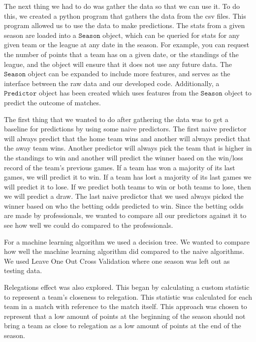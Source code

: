 \documentclass[conference]{IEEEtran}
\begin{document}
The next thing we had to do was gather the data so that we can use it. To do this, we created a python program that gathers the data from the csv files. This program allowed us to use the data to make predictions. The stats from a given season are loaded into a $\mathtt{Season}$ object, which can be queried for stats for any given team or the league at any date in the season. For example, you can request the number of points that a team has on a given date, or the standings of the league, and the object will ensure that it does not use any future data. The $\mathtt{Season}$ object can be expanded to include more features, and serves as the interface between the raw data and our developed code. Additionally, a $\mathtt{Predictor}$ object has been created which uses features from the $\mathtt{Season}$ object to predict the outcome of matches.

The first thing that we wanted to do after gathering the data was to get a baseline for predictions by using some naive predictors. The first naive predictor will always predict that the home team wins and another will always predict that the away team wins. Another predictor will always pick the team that is higher in the standings to win and another will predict the winner based on the win/loss record of the team's previous games. If a team has won a majority of its last games, we will predict it to win. If a team has lost a majority of its last games we will predict it to lose. If we predict both teams to win or both teams to lose, then we will predict a draw. The last naive predictor that we used always picked the winner based on who the betting odds predicted to win. Since the betting odds are made by professionals, we wanted to compare all our predictors against it to see how well we could do compared to the professionals.

For a machine learning algorithm we used a decision tree. We wanted to compare how well the machine learning algorithm did compared to the naive algorithms. We used Leave One Out Cross Validation where one season was left out as testing data.

Relegations effect was also explored. This began by calculating a custom statistic to represent a team's closeness to relegation. This statistic was calculated for each team in a match with reference to the match itself. This approach was chosen to represent that a low amount of points at the beginning of the season should not bring a team as close to relegation as a low amount of points at the end of the season.
\end{document}
